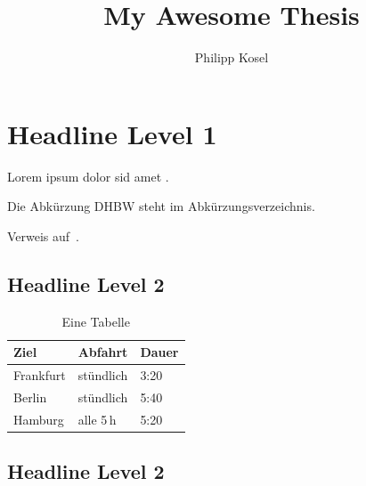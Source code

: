 \documentclass[
  12pt,
  BCOR=10mm,
  a4paper,
  bibliography=totoc,
  includefoot,
  listof=totoc,
  smallheadings,
]{scrartcl}
\newcounter{savepage}
\begin{document}
\title{My Awesome Thesis}
\author{Philipp Kosel}

\maketitle
\newpage

\cleardoublepage
{}
\ohead[]{}

\lipsum[1]
\newpage

\lipsum[1]
\newpage

\tableofcontents
\newpage

\listoffigures
\newpage

\listoftables
\newpage

\printnomenclature
\newpage

\cleardoublepage
{}
\ohead[\headmark]{\headmark}

\section{Headline Level 1}
\lipsum[1-2]

Lorem ipsum dolor sid amet \autocite{mcconnell2004}.

Die Abkürzung DHBW steht im Abkürzungsverzeichnis.

Verweis auf~.

\subsection{Headline Level 2}
\lipsum[1]

\begin{table}[htbp]
    \caption{Eine Tabelle}
    \label{tab:tabelle}
    \centering
    \begin{tabular}{lll}
        \toprule
        Ziel      & Abfahrt   & Dauer \\
        \midrule
        Frankfurt & stündlich & 3:20  \\
        Berlin    & stündlich & 5:40  \\
        Hamburg   & alle 5\,h & 5:20  \\
        \bottomrule
    \end{tabular}
\end{table}

\subsection{Headline Level 2}
\lipsum[1]
\end{document}
